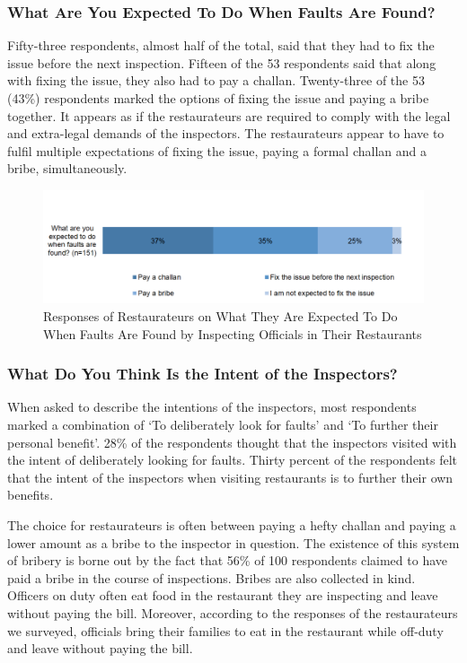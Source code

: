 \documentclass[a4paper, 12pt]{article}
\begin{document}
		\subsubsection {What Are You Expected To Do When Faults Are Found?}
		Fifty-three respondents, almost half of the total, said that they had to fix the issue before the next inspection. Fifteen of the 53 respondents said that along with fixing the issue, they also had to pay a challan. Twenty-three of the 53 (43\%) respondents 
marked the options of fixing the issue and paying a bribe together. It appears as if the restaurateurs are required to comply with the legal and extra-legal demands of the inspectors. The restaurateurs appear to have to fulfil multiple expectations of fixing the issue, 
paying a formal challan and a bribe, simultaneously.

		\begin{figure}[H]
                    	\centering
                    	\includegraphics[width = 6.5in]{Figure6.png}
                    	\caption[Optional Caption]{Responses of Restaurateurs on What They Are Expected To Do When Faults Are Found by Inspecting Officials in Their Restaurants}
		\end{figure}

		
		\subsubsection {What Do You Think Is the Intent of the Inspectors?}
			When asked to describe the intentions of the inspectors, most respondents marked a combination of ‘To deliberately look for faults’ and ‘To further their personal benefit’. 28\% of the respondents thought that the inspectors visited with the intent of 
deliberately looking for faults. Thirty percent of the respondents felt that the intent of the inspectors when visiting restaurants is to further their own benefits.
		
		The choice for restaurateurs is often between paying a hefty challan and paying a lower amount as a bribe to the inspector in question. The existence of this system of bribery is borne out by the fact that 56\% of 100 respondents claimed to have paid a 
bribe in the course of inspections. Bribes are also collected in kind. Officers on duty often eat food in the restaurant they are inspecting and leave without paying the bill. Moreover, according to the responses of the restaurateurs we surveyed, officials bring their 
families to eat in the restaurant while off-duty and leave without paying the bill.
		
\end{document}
